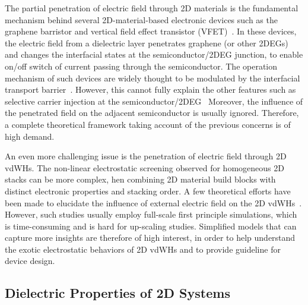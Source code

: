 The partial penetration of electric field through 2D materials is
the fundamental mechanism behind several 2D-material-based electronic
devices such as the graphene barristor and vertical field effect
transistor (VFET)~\cite{Yang_2012_Barristor,Shih_2015_PartiallyScreened}.
%
In these devices, the electric field from a dielectric layer
penetrates graphene (or other 2DEGs) and changes the interfacial
states at the semiconductor/2DEG junction, to enable on/off switch of
current passing through the semiconductor.
%
The operation mechanism of such devices are widely thought to be
modulated by the interfacial transport
barrier~\cite{Yang_2012_Barristor,Zhong_2014_SB,Dankert_2017_graphene_spin_SB}.
However, this cannot fully explain the other features such as
selective carrier injection at the
semiconductor/\allowbreak{}2DEG~\cite{Shih_2015_PartiallyScreened}
%
Moreover, the influence of the penetrated field on the adjacent
semiconductor is usually ignored.
%
Therefore, a complete theoretical framework taking account of the
previous concerns is of high demand.

An even more challenging issue is the penetration of electric field
through 2D vdWHs. The non-linear electrostatic screening observed for
homogeneous 2D stacks can be more complex, hen combining 2D material
build blocks with distinct electronic properties and stacking order.
%
A few theoretical efforts have been made to elucidate the influence of
external electric field on the 2D
vdWHs~\cite{Santos_2013_tunable_eps_gr,Santos_2013_ACSnano_kaxi,Lu_2017_ami_electro_doping}.
%
However, such studies usually employ full-scale first principle
simulations, which is time-consuming and is hard for up-scaling
studies.
%
Simplified models that can capture more insights are therefore of high
interest, in order to help understand the exotic electrostatic behaviors of 2D
vdWHs and to provide guideline for device design.


\subsection{Dielectric Properties of 2D Systems}
\label{sec:diel-prop-2d}

